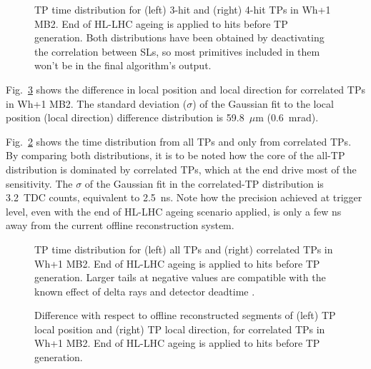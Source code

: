 \documentclass[../main.tex]{subfiles}
\begin{document}
\begin{figure}[h!]
\begin{center}
\end{center}
\caption{TP time distribution for (left) 3-hit and (right) 4-hit TPs in Wh+1 MB2. End of HL-LHC ageing is applied to hits before TP generation. Both distributions have been obtained by deactivating the correlation between SLs, so most primitives included in them won't be in the final algorithm's output.}
\label{dts:fig:time_uncor}
\end{figure}

Fig.~\ref{dts:fig:resol_fits} shows the difference in local position and local direction for correlated TPs in Wh+1 MB2. The standard deviation ($\sigma$) of the Gaussian fit to the local position (local direction) difference distribution is 59.8~$\mu$m (0.6~mrad).

Fig.~\ref{dts:fig:time} shows the time distribution from all TPs and only from correlated TPs. By comparing both distributions, it is to be noted how the core of the all-TP distribution is dominated by correlated TPs, which at the end drive most of the sensitivity. The $\sigma$ of the Gaussian fit in the correlated-TP distribution is 3.2~TDC counts, equivalent to 2.5~ns. Note how the precision achieved at trigger level, even with the end of HL-LHC ageing scenario applied, is only a few ns away from the current offline reconstruction system.

\begin{figure}[h!]
\begin{center}
\end{center}
\caption{TP time distribution for (left) all TPs and (right) correlated TPs in Wh+1 MB2. End of HL-LHC ageing is applied to hits before TP generation. Larger tails at negative values are compatible with the known effect of delta rays and detector deadtime \cite{intro:id:muon_13tev}.}
\label{dts:fig:time}
\end{figure}


\begin{figure}[h!]
\begin{center}
\end{center}
\caption{Difference with respect to offline reconstructed segments of (left) TP local position and (right) TP local direction, for correlated TPs in Wh+1 MB2. End of HL-LHC ageing is applied to hits before TP generation.}
\label{dts:fig:resol_fits}
\end{figure}
\end{document}
